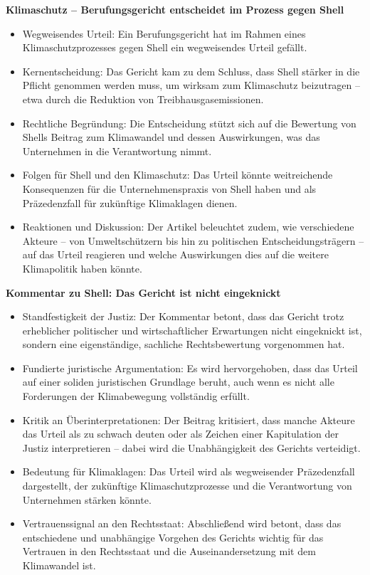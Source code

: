 \documentclass[a4paper, 12pt]{article} %
\begin{document}
 \textbf{\cite{deutschlandfunk.deKlimaschutzBerufungsgerichtEntscheidet2024} Klimaschutz – Berufungsgericht entscheidet im Prozess gegen Shell}

 \begin{itemize}
    \item Wegweisendes Urteil: Ein Berufungsgericht hat im Rahmen eines Klimaschutzprozesses gegen Shell ein wegweisendes Urteil gefällt.
    \item Kernentscheidung: Das Gericht kam zu dem Schluss, dass Shell stärker in die Pflicht genommen werden muss, um wirksam zum Klimaschutz beizutragen – etwa durch die Reduktion von Treibhausgasemissionen.
    \item Rechtliche Begründung: Die Entscheidung stützt sich auf die Bewertung von Shells Beitrag zum Klimawandel und dessen Auswirkungen, was das Unternehmen in die Verantwortung nimmt.
    \item Folgen für Shell und den Klimaschutz: Das Urteil könnte weitreichende Konsequenzen für die Unternehmenspraxis von Shell haben und als Präzedenzfall für zukünftige Klimaklagen dienen.
    \item Reaktionen und Diskussion: Der Artikel beleuchtet zudem, wie verschiedene Akteure – von Umweltschützern bis hin zu politischen Entscheidungsträgern – auf das Urteil reagieren und welche Auswirkungen dies auf die weitere Klimapolitik haben könnte.
 \end{itemize}

 \textbf{\cite{deutschlandfunk.deKommentarShellGericht2024} Kommentar zu Shell: Das Gericht ist nicht eingeknickt}

 \begin{itemize}
    \item Standfestigkeit der Justiz: Der Kommentar betont, dass das Gericht trotz erheblicher politischer und wirtschaftlicher Erwartungen nicht \glqq{}eingeknickt\grqq{} ist, sondern eine eigenständige, sachliche Rechtsbewertung vorgenommen hat.
    \item Fundierte juristische Argumentation: Es wird hervorgehoben, dass das Urteil auf einer soliden juristischen Grundlage beruht, auch wenn es nicht alle Forderungen der Klimabewegung vollständig erfüllt.
    \item Kritik an Überinterpretationen: Der Beitrag kritisiert, dass manche Akteure das Urteil als zu schwach deuten oder als Zeichen einer Kapitulation der Justiz interpretieren – dabei wird die Unabhängigkeit des Gerichts verteidigt.
    \item Bedeutung für Klimaklagen: Das Urteil wird als wegweisender Präzedenzfall dargestellt, der zukünftige Klimaschutzprozesse und die Verantwortung von Unternehmen stärken könnte.
    \item Vertrauenssignal an den Rechtsstaat: Abschließend wird betont, dass das entschiedene und unabhängige Vorgehen des Gerichts wichtig für das Vertrauen in den Rechtsstaat und die Auseinandersetzung mit dem Klimawandel ist.
 \end{itemize}
\end{document}
